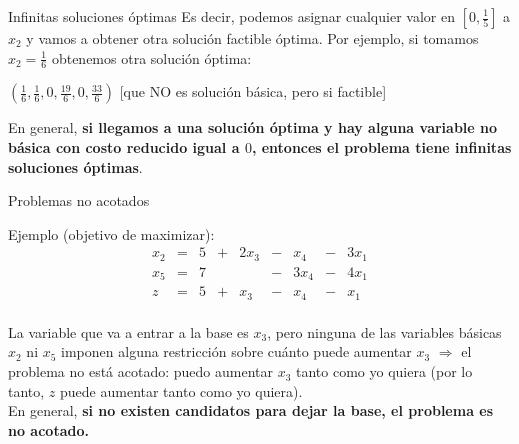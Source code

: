 \documentclass[10pt, aspectratio=169]{beamer}
\begin{document}
\begin{frame}{Infinitas soluciones óptimas}
   Es decir, podemos asignar cualquier valor en $[0,\frac{1}{5}]$ a $x_2$
    y vamos a obtener otra solución factible óptima. Por ejemplo, si tomamos $x_2=\frac{1}{6}$
    obtenemos otra solución óptima:

   $(\frac{1}{6}, \frac{1}{6}, 0, \frac{19}{6}, 0, \frac{33}{6})$ [que NO es solución básica, pero si factible]

    \vspace{1cm}
    En general, \textbf{si llegamos a una solución óptima y hay alguna variable no básica con costo reducido igual a
    $0$, entonces el problema tiene infinitas soluciones óptimas}.
\end{frame}

\begin{frame}{Problemas no acotados}

    Ejemplo (objetivo de maximizar):
    \[
        \begin{array}{ccccccccc}
            x_2 & = & 5 & + & 2x_3 & - & x_4  & - & 3x_1 \\
            x_5 & = & 7 &   &      & - & 3x_4 & - & 4x_1 \\ \hline
            z   & = & 5 & + & x_3  & - & x_4  & - & x_1  \\
        \end{array}
    \]

    La variable que va a entrar a la base es $x_3$, pero ninguna de las variables básicas $x_2$ ni $x_5$
    imponen alguna restricción sobre cuánto puede aumentar $x_3$ $\Rightarrow$
    el problema no está acotado: puedo aumentar $x_3$ tanto como yo quiera (por lo tanto, $z$
    puede aumentar tanto como yo quiera).\\
    \vskip 0.3cm
    En general, \textbf{si no existen candidatos para dejar la base, el problema es no acotado.}
\end{frame}
\end{document}
